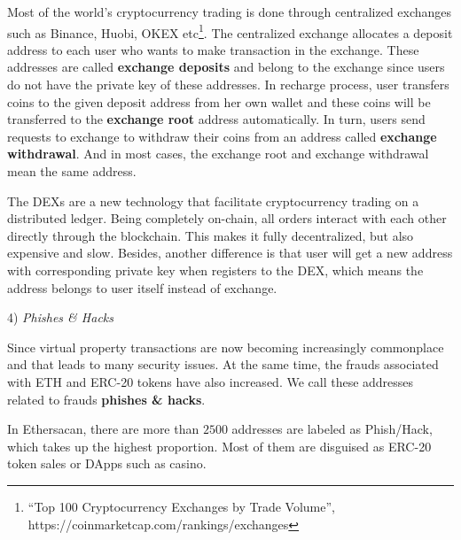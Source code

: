 Most of the world’s cryptocurrency trading is done through centralized exchanges such as Binance, Huobi, OKEX etc\footnote{``Top 100 Cryptocurrency Exchanges by Trade Volume'', https://coinmarketcap.com/rankings/exchanges}. The centralized exchange allocates a deposit address to each user who wants to make transaction in the exchange. These addresses are called \textbf{exchange deposits} and belong to the exchange since users do not have the private key of these addresses. In recharge process, user transfers coins to the given deposit address from her own wallet and these coins will be transferred to the \textbf{exchange root} address automatically. In turn, users send requests to exchange to withdraw their coins from an address called \textbf{exchange withdrawal}. And in most cases, the exchange root and exchange withdrawal mean the same address.


The DEXs are a new technology that facilitate cryptocurrency trading on a distributed ledger. Being completely on-chain, all orders interact with each other directly through the blockchain. This makes it fully decentralized, but also expensive and slow. Besides, another difference is that user will get a new address with corresponding private key when registers to the DEX, which means the address belongs to user itself instead of exchange. 
 


4) \emph{Phishes \& Hacks}

Since virtual property transactions are now becoming increasingly commonplace and that leads to many security issues. At the same time, the frauds associated with ETH and ERC-20 tokens have also increased. We call these addresses related to frauds \textbf{phishes \& hacks}.

 In Ethersacan, there are more than $2500$ addresses are labeled as Phish/Hack, which takes up the highest proportion. Most of them are disguised as ERC-20 token sales or DApps such as casino. 

